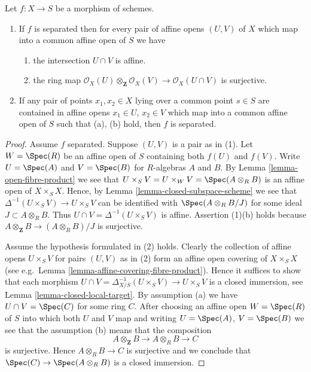 \begin{lemma}
\label{lemma-characterize-separated}
Let $f : X \to S$ be a morphism of schemes.
\begin{enumerate}
\item If $f$ is separated then for every pair of affine
opens $(U, V)$ of $X$ which map into a
common affine open of $S$ we have
\begin{enumerate}
\item the intersection $U \cap V$ is affine.
\item the ring map
$\mathcal{O}_X(U) \otimes_{\mathbf{Z}} \mathcal{O}_X(V)
\to \mathcal{O}_X(U \cap V)$
is surjective.
\end{enumerate}
\item If any pair of points $x_1, x_2 \in X$ lying over a common
point $s \in S$ are contained in affine opens $x_1 \in U$,
$x_2 \in V$ which map into a common affine open of $S$ such
that (a), (b) hold, then $f$ is separated.
\end{enumerate}
\end{lemma}

\begin{proof}
Assume $f$ separated. Suppose $(U, V)$ is a pair as in (1).
Let $W = \Spec(R)$ be an affine open of $S$ containing
both $f(U)$ and $f(V)$. Write $U = \Spec(A)$ and
$V = \Spec(B)$ for $R$-algebras $A$ and $B$.
By Lemma \ref{lemma-open-fibre-product} we see that
$U \times_S V = U \times_W V = \Spec(A \otimes_R B)$
is an affine open of $X \times_S X$. Hence, by
Lemma \ref{lemma-closed-subspace-scheme} we see that
$\Delta^{-1}(U \times_S V) \to U \times_S V$
can be identified with $\Spec(A \otimes_R B/J)$
for some ideal $J \subset A \otimes_R B$.
Thus $U \cap V = \Delta^{-1}(U \times_S V)$ is affine.
Assertion (1)(b) holds because
$A \otimes_{\mathbf{Z}} B \to (A \otimes_R B)/J$ is surjective.

\medskip\noindent
Assume the hypothesis formulated in (2) holds.
Clearly the collection of affine opens $U \times_S V$
for pairs $(U, V)$ as in (2) form an affine open covering
of $X \times_S X$ (see e.g.\ Lemma \ref{lemma-affine-covering-fibre-product}).
Hence it suffices to show that each morphism
$U \cap V = \Delta_{X/S}^{-1}(U \times_S V) \to U \times_S V$
is a closed immersion, see Lemma \ref{lemma-closed-local-target}.
By assumption (a) we have $U \cap V = \Spec(C)$ for some ring $C$.
After choosing an affine open $W = \Spec(R)$ of $S$
into which both $U$ and $V$ map and writing $U = \Spec(A)$,
$V = \Spec(B)$ we see that the assumption (b) means
that the composition
$$
A \otimes_{\mathbf{Z}} B \to A \otimes_R B \to C
$$
is surjective. Hence $A \otimes_R B \to C$ is surjective and
we conclude that $\Spec(C) \to \Spec(A \otimes_R B)$
is a closed immersion.
\end{proof}

